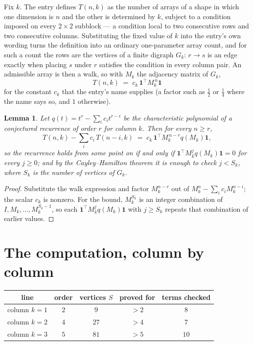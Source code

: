 \documentclass[11pt,a4paper]{article}
\theoremstyle{plain}
\newtheorem{lemma}[theorem]{Lemma}
\theoremstyle{definition}
\begin{document}
Fix $k$. The entry defines $T(n,k)$ as the number of arrays of a shape in which one dimension
is $n$ and the other is determined by $k$, subject to a condition imposed on every
$2\times2$ subblock --- a condition local to two consecutive rows and two consecutive columns.
Substituting the fixed value of $k$ into the entry's own wording turns the definition into an
ordinary one-parameter array count, and for such a count the rows are the vertices of a finite
digraph $G_k$: $r\to s$ is an edge exactly when placing $s$ under $r$ satisfies the condition
in every column pair. An admissible array is then a walk, so with $M_k$ the adjacency matrix
of $G_k$,
\[
T(n,k)\;=\;c_k\,\mathbf{1}^{\!\top}M_k^{\,n}\mathbf{1}
\]
for the constant $c_k$ that the entry's name supplies (a factor such as $\tfrac12$ or
$\tfrac14$ where the name says so, and $1$ otherwise).

\begin{lemma}\label{lem:crit}
Let $q(t)=t^{r}-\sum_i c_it^{r-i}$ be the characteristic polynomial of a conjectured
recurrence of order $r$ for column $k$. Then for every $n\ge r$,
\[
T(n,k)-\sum_i c_i\,T(n-i,k)\;=\;c_k\,\mathbf{1}^{\!\top}M_k^{\,n-r}q(M_k)\mathbf{1},
\]
so the recurrence holds from some point on if and only if
$\mathbf{1}^{\!\top}M_k^{j}q(M_k)\mathbf{1}=0$ for every $j\ge0$; and by the
Cayley--Hamilton theorem it is enough to check $j<S_k$, where $S_k$ is the number of vertices
of $G_k$.
\end{lemma}

\begin{proof}
Substitute the walk expression and factor $M_k^{n-r}$ out of $M_k^{n}-\sum_ic_iM_k^{n-i}$;
the scalar $c_k$ is nonzero. For the bound, $M_k^{S_k}$ is an integer combination of
$I,M_k,\dots,M_k^{S_k-1}$, so each $\mathbf{1}^{\!\top}M_k^{j}q(M_k)\mathbf{1}$ with
$j\ge S_k$ repeats that combination of earlier values.
\end{proof}

\section{The computation, column by column}

\begin{center}
\begin{tabular}{ccccc}
line & order & vertices $S$ & proved for & terms checked \\ \hline
column $k$$=1$ & $2$ & $9$ & $>2$ & $8$ \\
column $k$$=2$ & $4$ & $27$ & $>4$ & $7$ \\
column $k$$=3$ & $5$ & $81$ & $>5$ & $10$ \\
\end{tabular}
\end{center}
\end{document}
